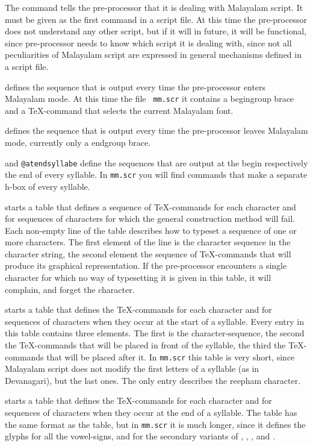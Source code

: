 The {\tt\@malayalam} command tells the pre-processor that it is
dealing with Malayalam script. It must be given as the first command
in a script file. At this time the pre-processor does not understand
any other script, but if it will in future, it will be functional,
since pre-processor needs to know which script it is dealing with,
since not all peculiarities of Malayalam script are expressed in
general mechanisms defined in a script file.

{\tt\@atbegin} defines the sequence that is output every time the
pre-processor enters Malayalam mode. At this time the file {\tt
mm.scr} it contains a begingroup brace and a \TeX-command that selects
the current Malayalam font.

{\tt\@atend} defines the sequence that is output every time the
pre-processor leaves Malayalam mode, currently only a endgroup brace.

{\tt\@atbeginsyllabe} and {\tt @atendsyllabe} define the sequences
that are output at the begin respectively the end of every syllable. In
{\tt mm.scr} you will find commands that make a separate h-box of
every syllable.

{\tt\@prebuild} starts a table that defines a sequence of
\TeX-commands for each character and for sequences of characters for
which the general construction method will fail. Each non-empty line
of the table describes how to typeset a sequence of one or more
characters. The first element of the line is the character sequence in
the character string, the second element the sequence of \TeX-commands
that will produce its graphical representation. If the pre-processor
encounters a single character for which no way of typesetting it is
given in this table, it will complain, and forget the character.

{\tt\@primary} starts a table that defines the \TeX-commands for each
character and for sequences of characters when they occur at the start
of a syllable. Every entry in this table contains three elements. The
first is the character-sequence, the second the \TeX-commands that
will be placed in front of the syllable, the third the \TeX-commands
that will be placed after it. In {\tt mm.scr} this table is very
short, since Malayalam script does not modify the first letters of a
syllable (as in Devanagari), but the last ones. The only entry
describes the reepham character.

{\tt\@secondary} starts a table that defines the \TeX-commands for each
character and for sequences of characters when they occur at the end
of a syllable. The table has the same format as the {\tt\@primary}
table, but in {\tt mm.scr} it is much longer, since it defines the
glyphs for all the vowel-signs, and for the secondary variants of
{\mm {}}, {\mm {}}, {\mm {}}, and {\mm {}}.

